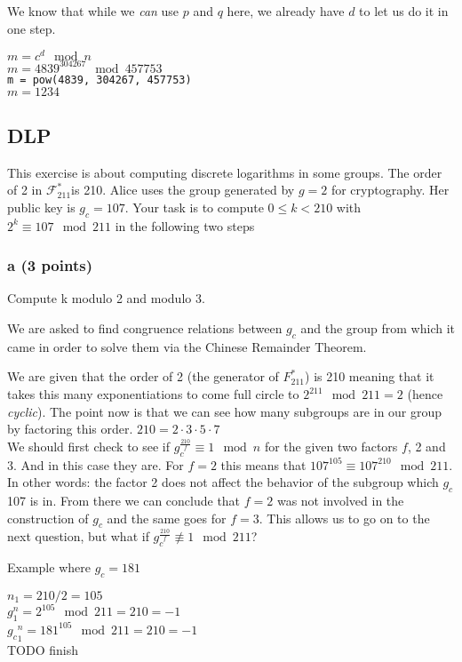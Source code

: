 \documentclass{article}
\begin{document}
We know that while we \textit{can} use $p$ and $q$ here, we already have $d$ to let
us do it in one step.

$m=c^d \mod n$ \\
$m=4839^{304267} \mod 457753$ \\
\verb|m = pow(4839, 304267, 457753)| \\
$m = 1234$

\subsection{DLP}
This exercise is about computing discrete logarithms in some groups.
The order of 2 in $\mathcal{F}_{211}^{*}$is 210. Alice uses the group generated
by $g = 2$ for cryptography. Her public key is $g_c = 107$.
Your task is to compute $0 \leq k < 210$ with $2^k \equiv 107 \mod 211$ in the following two steps

\subsubsection{a (3 points)}
Compute k modulo 2 and modulo 3.

We are asked to find congruence relations between $g_c$ and the group from
which it came in order to solve them via the Chinese Remainder Theorem.

We are given that the order of 2 (the generator of $F_{211}^{*}$) is 210
meaning that it takes this many exponentiations to come full circle to
$2^{211} \mod 211 = 2$ (hence \textit{cyclic}).
The point now is that we can see how many subgroups are in our group by
factoring this order.
$210 = 2 \cdot 3 \cdot 5 \cdot 7$ \\

We should first check to see if $g_c^{\frac{210}{f}} \equiv 1 \mod n$
for the given two factors $f$, 2 and 3. And in this case they are.
For $f=2$ this means that $107^{105} \equiv 107^{210} \mod 211$.
In other words: the factor 2 does not affect the behavior of the subgroup which
$g_c$ 107 is in. From there we can conclude that $f=2$ was not involved in the
construction of $g_c$ and the same goes for $f=3$.
This allows us to go on to the next question, but what if $g_c^{\frac{210}{f}}
\not \equiv 1 \mod 211$?

Example where $g_c=181$

$n_1 = 210/2 = 105$ \\
$g^n_1 = 2^{105} \mod 211 = 210 = -1$ \\
${g_c}^n_1 = 181^{105} \mod 211 = 210 = -1$ \\
TODO finish
\end{document}
